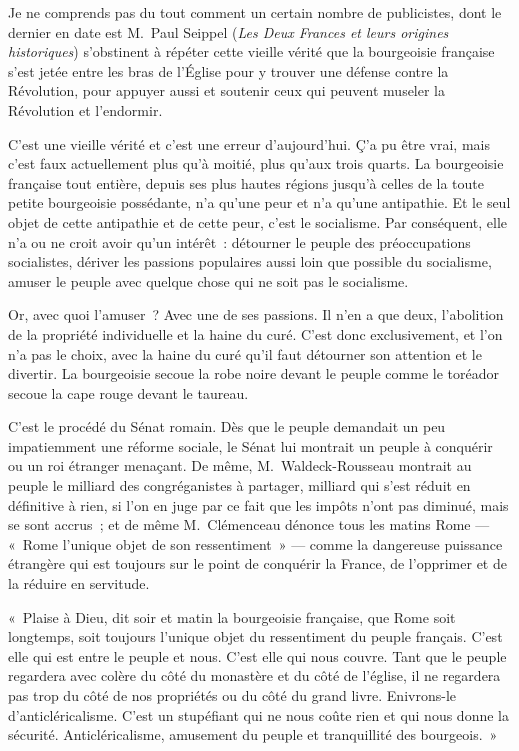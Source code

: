 \documentclass[french,twoside]{book} %
\begin{document}
Je ne comprends pas du tout comment un certain  nombre de publicistes, dont le dernier en date est M. Paul Seippel (\emph{Les Deux Frances et leurs origines historiques}) s’obstinent à répéter cette vieille vérité que la bourgeoisie française s’est jetée entre les bras de l’Église pour y trouver une défense contre la Révolution, pour appuyer aussi et soutenir ceux qui peuvent museler la Révolution et l’endormir.\par
C’est une vieille vérité et c’est une erreur d’aujourd’hui. Ç’a pu être vrai, mais c’est faux actuellement plus qu’à moitié, plus qu’aux trois quarts. La bourgeoisie française tout entière, depuis ses plus hautes régions jusqu’à celles de la toute petite bourgeoisie possédante, n’a qu’une peur et n’a qu’une antipathie. Et le seul objet de cette antipathie et de cette peur, c’est le socialisme. Par conséquent, elle n’a ou ne croit avoir qu’un intérêt : détourner le peuple des préoccupations socialistes, dériver les passions populaires aussi loin que possible du socialisme, amuser le peuple avec quelque chose qui ne soit pas le socialisme.\par
Or, avec quoi l’amuser ? Avec une de ses passions. Il n’en a que deux, l’abolition de la propriété individuelle et la haine du curé. C’est donc exclusivement, et l’on n’a pas le choix, avec la haine du curé qu’il faut détourner son attention et le divertir. La bourgeoisie secoue la robe noire  devant le peuple comme le toréador secoue la cape rouge devant le taureau.\par
C’est le procédé du Sénat romain. Dès que le peuple demandait un peu impatiemment une réforme sociale, le Sénat lui montrait un peuple à conquérir ou un roi étranger menaçant. De même, M. Waldeck-Rousseau montrait au peuple le milliard des congréganistes à partager, milliard qui s’est réduit en définitive à rien, si l’on en juge par ce fait que les impôts n’ont pas diminué, mais se sont accrus ; et de même M. Clémenceau dénonce tous les matins Rome — « Rome l’unique objet de son ressentiment » — comme la dangereuse puissance étrangère qui est toujours sur le point de conquérir la France, de l’opprimer et de la réduire en servitude.\par
« Plaise à Dieu, dit soir et matin la bourgeoisie française, que Rome soit longtemps, soit toujours l’unique objet du ressentiment du peuple français. C’est elle qui est entre le peuple et nous. C’est elle qui nous couvre. Tant que le peuple regardera avec colère du côté du monastère et du côté de l’église, il ne regardera pas trop du côté de nos propriétés ou du côté du grand livre. Enivrons-le d’anticléricalisme. C’est un stupéfiant qui ne nous coûte rien et qui nous donne la sécurité. Anticléricalisme, amusement du peuple et tranquillité des bourgeois. »\par
\end{document}
